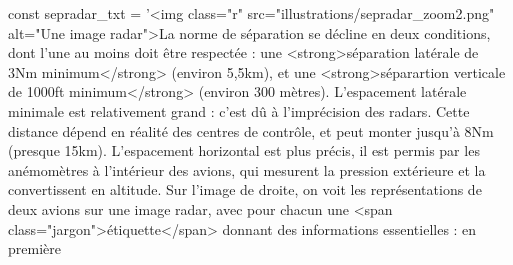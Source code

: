 \documentclass[11pt]{article}
\begin{document}
\begin{code2}
			const sepradar_txt = '<img class="r" src="illustrations/sepradar_zoom2.png" alt="Une image radar">La norme de séparation se décline en deux conditions, dont l'une au moins doit être respectée : une <strong>séparation latérale de 3Nm minimum</strong> (environ 5,5km), et une <strong>séparartion verticale de 1000ft minimum</strong> (environ 300 mètres). L'espacement latérale minimale est relativement grand : c'est dû à l'imprécision des radars. Cette distance dépend en réalité des centres de contrôle, et peut monter jusqu'à 8Nm (presque 15km). L'espacement horizontal est plus précis, il est permis par les anémomètres à l'intérieur des avions, qui mesurent la pression extérieure et la convertissent en altitude. Sur l'image de droite, on voit les représentations de deux avions sur une image radar, avec pour chacun une <span class="jargon">étiquette</span> donnant des informations essentielles : en première\end{code2}
\end{document}
